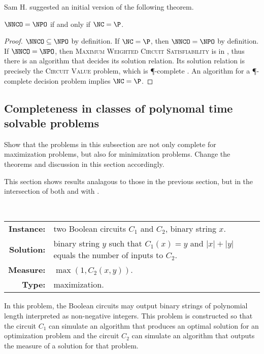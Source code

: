 \documentclass[]{article}
\begin{document}
Sam H. suggested an initial version of the following theorem.

\begin{theorem}\label{thm:nnconpo}
  $\NNCO = \NPO$ if and only if $\NC = \P$.
\end{theorem}
\begin{proof}
  $\NNCO \subseteq \NPO$ by definition.
  If $\NC = \P$, then $\NNCO = \NPO$ by definition.
  If $\NNCO = \NPO$, then \textsc{Maximum Weighted Circuit Satisfiability} is in \NNCO{}, thus there is an \NC{} algorithm that decides its solution relation.
  Its solution relation is precisely the \textsc{Circuit Value} problem, which is \P-complete \cite[Problem~A.1.1]{ghr95}.
  An \NC{} algorithm for a \P-complete decision problem implies $\NC = \P$.
\end{proof}

\subsection{Completeness in classes of polynomal time solvable problems}

\begin{todo}
  Show that the problems in this subsection are not only complete for maximization problems, but also for minimization problems.
  Change the theorems and discussion in this section accordingly.
\end{todo}

This section shows results analagous to those in the previous section, but in the intersection of both \NPO{} and \NNCO{} with \PO.

\begin{definition}
  \mbox{} \\
  \begin{tabular}{r p{9.5cm}}
    \textbf{Instance:} & two Boolean circuits $C_1$ and $C_2$, binary string $x$. \\
    \textbf{Solution:} & binary string $y$ such that $C_1(x) = y$ and $|x| + |y|$ equals the number of inputs to $C_2$. \\
    \textbf{Measure:} & $\max(1, C_2(x, y))$. \\
    \textbf{Type:} & maximization.
  \end{tabular}
\end{definition}

In this problem, the Boolean circuits may output binary strings of polynomial length interpreted as non-negative integers.
This problem is constructed so that the circuit $C_1$ can simulate an algorithm that produces an optimal solution for an optimization problem and the circuit $C_2$ can simulate an algorithm that outputs the measure of a solution for that problem.
\end{document}
